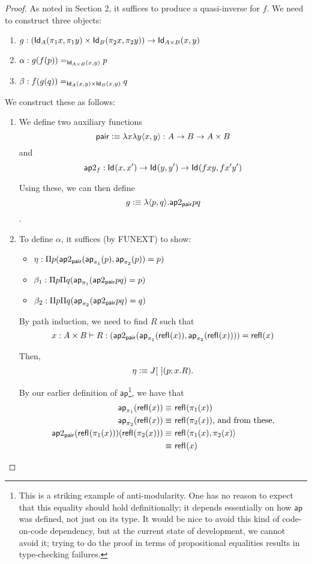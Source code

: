 \documentclass[12pt]{article}
\newcommand{\ap}{\mathsf{ap}}
\begin{document}
\begin{proof}
 As noted in Section 2, it suffices to produce a quasi-inverse for $f$.
 We need to construct three objects:
 \begin{enumerate}
  \item $g: ( \mathsf{Id}_{A}(\pi_1 x, \pi_1 y) \times \mathsf{Id}_{B}(\pi_2 x, \pi_2 y) ) \to \mathsf{Id}_{A\times B} (x,y)$
  \item $\alpha: g(f(p)) =_{\mathsf{Id}_{A\times B} (x,y)} p$
  \item $\beta: f(g(q)) =_{\mathsf{Id}_{A}(x,y)\times \mathsf{Id}_{B}(x,y)} q$
 \end{enumerate}
 We construct these as follows:
 \begin{enumerate}
  \item We define two auxiliary functions
  $$\mathsf{pair} \vcentcolon\equiv \lambda x \lambda y \langle x, y \rangle : A\to B\to A\times B$$
  and
  $$\ap2_f: \Id{}(x,x') \to \Id{}(y,y') \to \Id{}(f x y, f x' y')$$ 
  
  Using these, we can then define
  $$g\defeq \lambda \langle p,q \rangle .\ap2_\pair p q$$.
  
  \item To define $\alpha$, it suffices (by FUNEXT) to show:
  \begin{itemize}
   \item $\eta: \Pi p(\ap2_\pair (\ap_{\pi_1}(p), \ap_{\pi_2}(p)) = p)$
   \item $\beta_1: \Pi p \Pi q (\ap_{\pi_1} (\ap2_\pair p q) = p)$
   \item $\beta_2: \Pi p \Pi q (\ap_{\pi_2} (\ap2_\pair p q) = q)$
  \end{itemize}

  By path induction, we need to find $R$ such that
  $$x:A\times B \entails R:(\ap2_\pair(\ap_{\pi_1}(\refl{}(x)),\ap_{\pi_2}(\refl{}(x))))=\refl{}(x)$$
  
  Then,
  $$\eta\vcentcolon\equiv J[\ ](p; x.R).$$
  
  By our earlier definition of $\ap$\footnote{
  This is a striking example of anti-modularity. One has no reason to expect that this 
  equality should hold definitionally; it depends essentially on how $\ap$ was defined, 
  not just on its type. It would be nice to avoid this kind of code-on-code dependency,
  but at the current state of development, we cannot avoid it; trying to do the proof
  in terms of propositional equalities results in type-checking failures.
  }, we have that
  \begin{align*}
   \ap_{\pi_1}(\refl{}(x))\equiv &\ \refl{}(\pi_1(x)) \\
   \ap_{\pi_2}(\refl{}(x))\equiv &\ \refl{}(\pi_2(x))\text{, and from these,} \\
   \ap2_\pair(\refl{}(\pi_1(x))) (\refl{}(\pi_2(x))) \equiv &\ \refl{}\langle \pi_1(x),\pi_2(x)\rangle \\
   \equiv &\ \refl{}(x)
  \end{align*}


\end{enumerate}
\end{proof}
\end{document}
